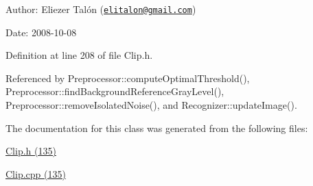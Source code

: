 \begin{Desc}
\item[Author:]Eliezer Talón (\href{mailto:elitalon@gmail.com}{\tt elitalon@gmail.com}) \end{Desc}
\begin{Desc}
\item[Date:]2008-10-08 \end{Desc}


Definition at line 208 of file Clip.h.

Referenced by Preprocessor::computeOptimalThreshold(), Preprocessor::findBackgroundReferenceGrayLevel(), Preprocessor::removeIsolatedNoise(), and Recognizer::updateImage().

The documentation for this class was generated from the following files:\begin{CompactItemize}
\item 
\hyperlink{_clip_8h}{Clip.h (135)}\item 
\hyperlink{_clip_8cpp}{Clip.cpp (135)}\end{CompactItemize}
